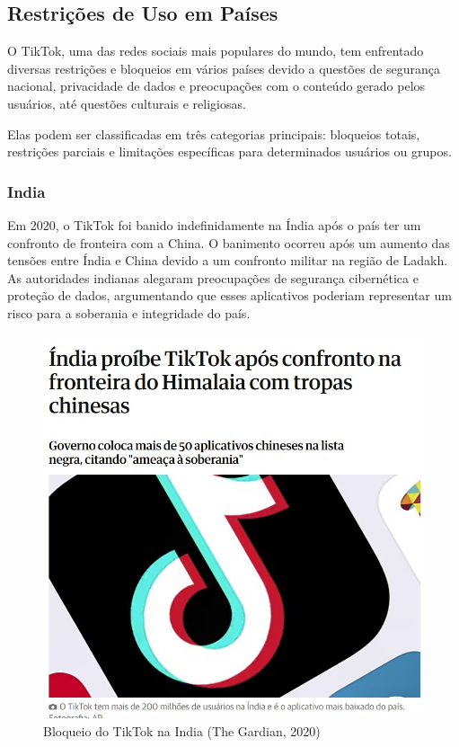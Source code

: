 \newpage
\subsection{Restrições de Uso em Países}

O TikTok, uma das redes sociais mais populares do mundo, tem enfrentado diversas restrições e bloqueios em vários países devido a questões de segurança nacional, privacidade de dados e preocupações com o conteúdo gerado pelos usuários, até questões culturais e religiosas.\vskip0.3cm

Elas podem ser classificadas em três categorias principais: bloqueios totais, restrições parciais e limitações específicas para determinados usuários ou grupos.


\subsubsection{India}

Em 2020, o TikTok foi banido indefinidamente na Índia após o país ter um confronto de fronteira com a China. O banimento ocorreu após um aumento das tensões entre Índia e China devido a um confronto militar na região de Ladakh. As autoridades indianas alegaram preocupações de segurança cibernética e proteção de dados, argumentando que esses aplicativos poderiam representar um risco para a soberania e integridade do país.
\vskip0.3cm

\begin{figure}[H]
    \centering
    \includegraphics[width=0.7\linewidth]{TIKTOK1.jpg}
    \caption{Bloqueio do TikTok na India (The Gardian, 2020)}
    \label{fig:enter-label} 
\end{figure}


